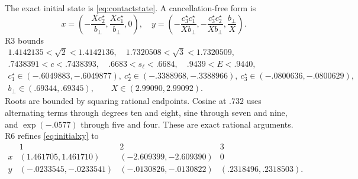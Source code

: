 \documentclass[11pt,a4paper]{article}
\numberwithin{equation}{section}
\begin{document}
The exact initial state is \eqref{eq:contactstate}. A cancellation-free form is
\begin{equation}\label{eq:initialxy}
x=\left(-\frac{Xc^\star_2}{b_\perp},
\frac{Xc^\star_1}{b_\perp},0\right),\quad
y=\left(-\frac{c^\star_3c^\star_1}{Xb_\perp},
-\frac{c^\star_3c^\star_2}{Xb_\perp},\frac{b_\perp}{X}\right).
\end{equation}
R3 bounds
\[
\begin{gathered}
1.4142135<\sqrt2<1.4142136,\quad
1.7320508<\sqrt3<1.7320509,\\
.7438391<c<.7438393,\quad .6683<s_\ell<.6684,\quad .9439<E<.9440,\\
c^\star_1\in(-.6049883,-.6049877),\
c^\star_2\in(-.3388968,-.3388966),\
c^\star_3\in(-.0800636,-.0800629),\\
b_\perp\in(.69344,.69345),\qquad X\in(2.99090,2.99092).
\end{gathered}
\]
Roots are bounded by squaring rational endpoints. Cosine at $.732$ uses
alternating terms through degrees ten and eight, sine through seven and
nine, and $\exp(-.0577)$ through five and four. These are exact rational
arguments. R6 refines \eqref{eq:initialxy} to
\[
\begin{array}{c|ccc}
&1&2&3\\ \hline
x&(1.461705,1.461710)&(-2.609399,-2.609390)&0\\
y&(-.0233545,-.0233541)&(-.0130826,-.0130822)&(.2318496,.2318503).
\end{array}
\]
\end{document}
